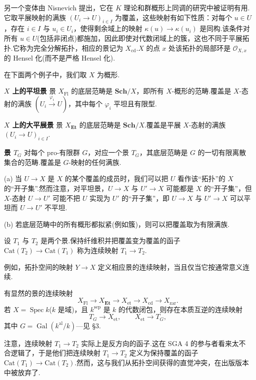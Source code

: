 另一个变体由 Nisnevich 提出，它在 $K$ 理论和群概形上同调的研究中被证明有用.它取平展映射的满族 $(U_i \to U)_{i \in I}$ 为覆盖，这些映射有如下性质：对每个 $u \in U$，存在 $i \in I$ 与 $u_i \in U_i$，使得剩余域上的映射 $\kappa(u) \to \kappa(u_i)$ 是同构.该条件对所有 $u \in U$(包括非闭点)都施加，因此即使对代数闭域上的簇，这也不同于平展拓扑.它称为完全分解拓扑，相应的景记为 $X_{\mathrm{cd}}$.$X$ 的点 $x$ 处该拓扑的局部环是 $\mathcal{O}_{X, x}$ 的 Hensel 化(而不是严格 Hensel 化).

在下面两个例子中，我们取 $X$ 为概形.

\textbf{$X$ 上的平坦景} 景 $X_{\mathrm{Fl}}$ 的底层范畴是 $\mathbf{Sch}/X$，即所有 $X$-概形的范畴.覆盖是 $X$-态射的满族 $\left(U_i \xrightarrow{\varphi_i} U\right)$，其中每个 $\varphi_i$ 平坦且有限型.

\textbf{$X$ 上的大平展景} 景 $X_{\mathbf{Et}}$ 的底层范畴是 $\mathbf{Sch}/X$.覆盖是平展 $X$-态射的满族 $(U_i \to U)_{i \in I}$.

\textbf{景 $T_G$} 对每个 pro-有限群 $G$，对应一个景 $T_G$，其底层范畴是 $G$ 的一切有限离散集合的范畴.覆盖是 $G$-映射的任何满族.

\begin{remark}\label{rem:5.1}
(a) 当 $U \to X$ 是 $X$ 的某个覆盖的成员时，我们可以把 $U$ 看作该``拓扑''的 $X$ 的``开子集''.然而注意，对平坦景，$U \to X$ 与 $U' \to X$ 可能都是 $X$ 的``开子集''，但 $X$-态射 $U \to U'$ 可能不把 $U$ 实现为 $U'$ 的``开子集''，即 $U \to X$ 与 $U' \to X$ 可以平坦而 $U \to U'$ 不平坦.

(b) 若底层范畴中的所有概形都拟紧(例如簇)，则可以把覆盖取为有限满族.
\end{remark}

\begin{definition}\label{def:5.2}
设 $T_1$ 与 $T_2$ 是两个景.保持纤维积并把覆盖变为覆盖的函子 $\mathrm{Cat}(T_2) \to \mathrm{Cat}(T_1)$ 称为连续映射 $T_1 \to T_2$.
\end{definition}

例如，拓扑空间的映射 $Y \to X$ 定义相应景的连续映射，当且仅当它按通常意义连续.

有显然的景的连续映射
\[
X_{\mathrm{Fl}} \to X_{\mathbf{Et}} \to X_{\mathrm{et}} \to X_{\mathrm{cd}} \to X_{\mathrm{zar}}.
\]
若 $X = \operatorname{Spec} k$($k$ 是域)，且 $k^{\mathrm{sep}}$ 是 $k$ 的代数闭包，则存在本质互逆的连续映射
\[
T_G \to X_{\mathrm{et}}, \qquad X_{\mathrm{et}} \to T_G,
\]
其中 $G = \operatorname{Gal}(k^{\mathrm{al}}/k)$---见 \S 3.

\begin{remark}\label{rem:5.3}
注意，连续映射 $T_1 \to T_2$ 实际上是反方向的函子.这在 SGA 4 的参与者看来太不合逻辑了，于是他们把连续映射 $T_1 \to T_2$ 定义为保持覆盖的函子 $\mathrm{Cat}(T_1) \to \mathrm{Cat}(T_2)$.然而，这与我们从拓扑空间获得的直觉冲突，在出版版本中被放弃了.
\end{remark}

